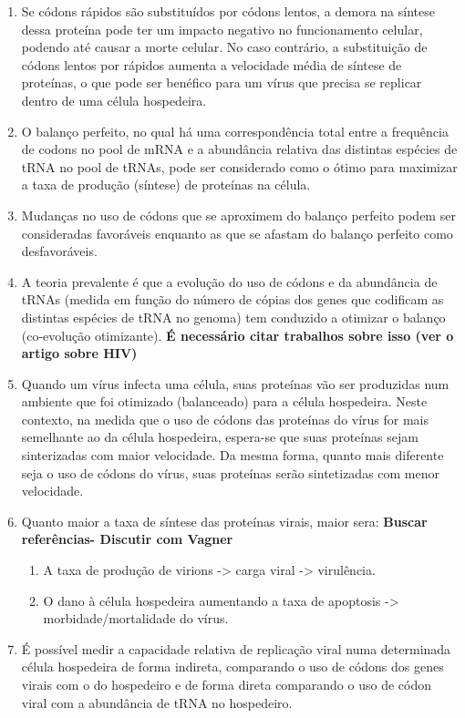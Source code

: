 \documentclass[12pt]{article}
\begin{document}
\begin{enumerate}
    \item Se códons rápidos são substituídos por códons lentos, a demora na síntese dessa proteína pode ter um impacto negativo no funcionamento celular, podendo até causar a morte celular. No caso contrário, a substituição de códons lentos por rápidos aumenta a velocidade média de síntese de proteínas, o que pode ser benéfico para um vírus que precisa se replicar dentro de uma célula hospedeira.
    \item O balanço perfeito, no qual há uma correspondência total entre a frequência de codons no pool de mRNA e a abundância relativa das distintas espécies de tRNA no pool de tRNAs, pode ser considerado como o ótimo para maximizar a taxa de produção (síntese) de proteínas na célula.
    \item Mudanças no uso de códons que se aproximem do balanço perfeito podem ser consideradas favoráveis enquanto as que se afastam do balanço perfeito como desfavoráveis.
    \item A teoria prevalente é que a evolução do uso de códons e da abundância de tRNAs (medida em função do número de cópias dos genes que codificam as distintas espécies de tRNA no genoma) tem conduzido a otimizar o balanço (co-evolução otimizante). \textbf{É necessário citar trabalhos sobre isso (ver o artigo sobre HIV)}
    \item Quando um vírus infecta uma célula, suas proteínas vão ser produzidas num ambiente que foi otimizado (balanceado) para a célula hospedeira. Neste contexto, na medida que o uso de códons das proteínas do vírus for mais semelhante ao da célula hospedeira, espera-se que suas proteínas sejam sinterizadas com maior velocidade. Da mesma forma, quanto mais diferente seja o uso de códons do vírus, suas proteínas serão sintetizadas com menor velocidade.
    \item Quanto maior a taxa de síntese das proteínas virais, maior sera: \textbf{Buscar referências- Discutir com Vagner}
          \begin{enumerate}
              \item A taxa de produção de virions -> carga viral -> virulência.
              \item O dano à célula hospedeira aumentando a taxa de apoptosis -> morbidade/mortalidade do vírus.
          \end{enumerate}
    \item É possível medir a capacidade relativa de replicação viral numa determinada célula hospedeira de forma indireta, comparando o uso de códons dos genes virais com o do hospedeiro e de forma direta comparando o uso de códon viral com a abundância de tRNA no hospedeiro.

\end{enumerate}
\end{document}
